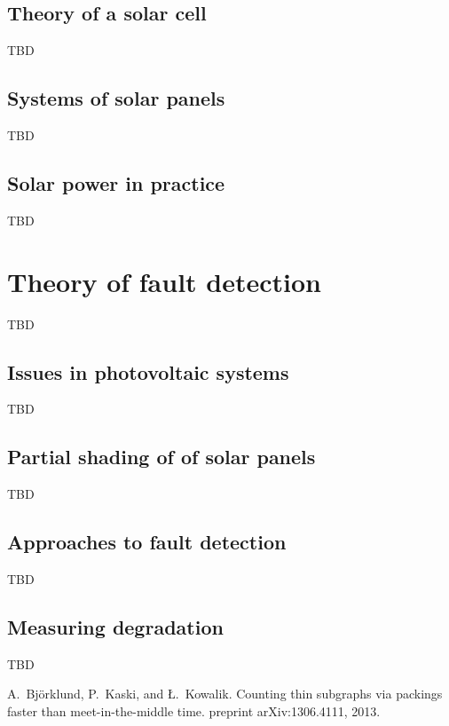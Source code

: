\documentclass[a4paper,11pt]{report}
\begin{document}
\section{Theory of a solar cell}
TBD

\section{Systems of solar panels}
TBD

\section{Solar power in practice}
TBD


\chapter{Theory of fault detection}
TBD

\section{Issues in photovoltaic systems}
TBD

\section{Partial shading of of solar panels}
TBD

\section{Approaches to fault detection}
TBD

\section{Measuring degradation}
TBD

\begin{thebibliography}{10}

A.~{Bj{\"o}rklund}, P.~Kaski, and {\L}.~Kowalik.
\newblock Counting thin subgraphs via packings faster than meet-in-the-middle time.
 preprint arXiv:1306.4111, 2013.

\end{thebibliography}
\end{document}
